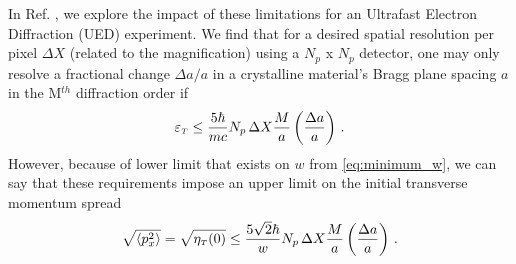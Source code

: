 In Ref. \cite{berger_dc_2009}, we explore the impact of these limitations for an Ultrafast Electron Diffraction (UED) experiment.
We find that for a desired spatial resolution per pixel $\Delta X$ (related to the magnification) using a $N_p$ x $N_p$ detector, one may only resolve a fractional change $\Delta a / a$ in a crystalline material's Bragg plane spacing $a$ in the M$^{th}$ diffraction order if
\begin{equation}
  \varepsilon_{{\scriptscriptstyle T}} \le \frac{5 \hbar}{m c} N_p \, \Delta X \frac{M}{a} \left ( \frac{\Delta a}{a} \right ) \,\text{.}
\end{equation}
However, because of lower limit that exists on $w$ from \ref{eq:minimum_w}, we can say that these requirements impose an upper limit on the initial transverse momentum spread
\begin{equation}
  \sqrt{ \left < p_x^2 \right > } = \sqrt{ \eta_{{\scriptscriptstyle T}} (0) } \le \frac{5\sqrt{2} \hbar}{w} N_p \, \Delta X \frac{M}{a} \left ( \frac{\Delta a}{a} \right ) \,\text{.}
\end{equation}

